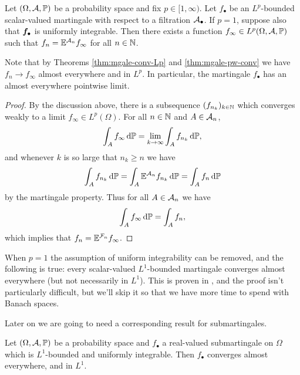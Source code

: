 \begin{thm}\label{thm:mgale-cv-repn}
  Let $(\Omega,\mathcal{A},\mathbb{P})$ be a probability space and fix $p \in [1,\infty)$.
  Let $f_{\bullet}$ be an $L^p$-bounded scalar-valued martingale with respect to a filtration $\mathcal{A}_{\bullet}$.
  If $p = 1$, suppose also that $\bm{f}_{\bullet}$ is uniformly integrable.
  Then there exists a function $f_\infty \in L^p(\Omega,\mathcal{A},\mathbb{P})$ such that $f_n = \mathbb{E}^{\mathcal{A}_n} f_\infty$ for all $n \in \mathbb{N}$.
\end{thm}

Note that by Theorems \ref{thm:mgale-conv-Lp} and \ref{thm:mgale-pw-conv} we have $f_n \to f_\infty$ almost everywhere and in $L^p$.
In particular, the martingale $f_{\bullet}$ has an almost everywhere pointwise limit.

\begin{proof}
  By the discussion above, there is a subsequence $(f_{n_k})_{k \in \mathbb{N}}$ which converges weakly to a limit $f_\infty \in L^p(\Omega)$.
  For all $n \in \mathbb{N}$ and $A \in \mathcal{A}_n$,
  \begin{equation*}
    \int_A f_\infty \, \mathrm{d}\mathbb{P} = \lim_{k \to \infty} \int_A f_{n_k} \, \mathrm{d}\mathbb{P},
  \end{equation*}
  and whenever $k$ is so large that $n_k \geq n$ we have
  \begin{equation*}
    \int_A f_{n_k} \, \mathrm{d}\mathbb{P} = \int_A \mathbb{E}^{\mathcal{A}_n} f_{n_k} \, \mathrm{d} \mathbb{P} = \int_A f_{n} \, \mathrm{d}\mathbb{P}
  \end{equation*}
  by the martingale property.
  Thus for all $A \in \mathcal{A}_n$ we have
  \begin{equation*}
    \int_A f_\infty \, \mathrm{d}\mathbb{P} = \int_A f_n,
  \end{equation*}
  which implies that $f_n = \mathbb{E}^{\mathcal{F}_n} f_\infty$.
\end{proof}

\begin{rmk}\label{rmk:mgale-cv-p1}
  When $p = 1$ the assumption of uniform integrability can be removed, and the following is true: every scalar-valued $L^1$-bounded martingale converges almost everywhere (but not necessarily in $L^1$).
  This is proven in \cite[Theorem 1.34]{gP16}, and the proof isn't particularly difficult, but we'll skip it so that we have more time to spend with Banach spaces.
\end{rmk}

Later on we are going to need a corresponding result for submartingales.

\begin{thm}\label{thm:submartingale-convergence}
  Let $(\Omega,\mathcal{A},\mathbb{P})$ be a probability space and $f_{\bullet}$ a real-valued submartingale on $\Omega$ which is $L^1$-bounded and uniformly integrable.
  Then $f_\bullet$ converges almost everywhere, and in $L^1$.
\end{thm}

